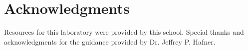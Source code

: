 \documentclass[
    10pt,aps,prl,
    amsfonts,
    amssymb,
    amsmath,
    draft,
    runinaddress,
    secnum,
    showkeys,
    superscriptaddress,
    twocolumn,
]{revtex4}
\begin{document}
\section{Acknowledgments}
\label{sec:ack}
\begin{acknowledgments}
    Resources for this laboratory were provided by this school.
    Special thanks and acknowledgments for the guidance provided by Dr. Jeffrey P. Hafner.
\end{acknowledgments}




\end{document}
